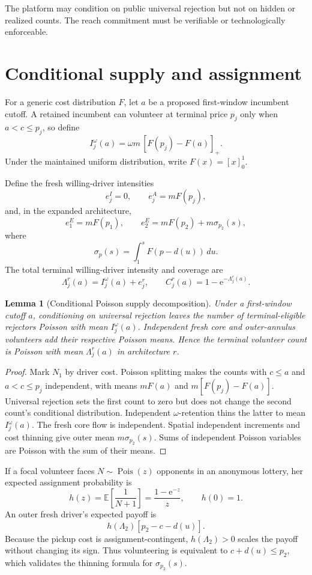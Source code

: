 \documentclass[11pt]{article}
\newtheorem{lemma}[theorem]{Lemma}
\theoremstyle{definition}
\theoremstyle{remark}
\newcommand{\E}{\mathbb E}
\newcommand{\e}{\mathrm e}
\begin{document}
The platform may condition on public universal rejection but not on hidden or
realized counts.  The reach commitment must be verifiable or technologically
enforceable.

\section{Conditional supply and assignment}

For a generic cost distribution $F$, let $a$ be a proposed first-window
incumbent cutoff.  A retained incumbent can volunteer at terminal price $p_j$
only when $a<c\le p_j$, so define
\[
I_j^\omega(a)=\omega m\,[F(p_j)-F(a)]_+.
\]
Under the maintained uniform distribution, write $F(x)=[x]_0^1$.

Define the fresh willing-driver intensities
\[
e_j^I=0,
\qquad
e_j^A=mF(p_j),
\]
and, in the expanded architecture,
\[
e_1^E=mF(p_1),
\qquad
e_2^E=mF(p_2)+m\sigma_{p_2}(s),
\]
where
\[
\sigma_p(s)=\int_1^s F(p-d(u))\,du.
\]
The total terminal willing-driver intensity and coverage are
\[
\Lambda_j^r(a)=I_j^\omega(a)+e_j^r,
\qquad
C_j^r(a)=1-\e^{-\Lambda_j^r(a)}.
\]

\begin{lemma}[Conditional Poisson supply decomposition]
\label{lem:poisson}
Under a first-window cutoff $a$, conditioning on universal rejection leaves
the number of terminal-eligible rejectors Poisson with mean
$I_j^\omega(a)$.  Independent fresh core and outer-annulus volunteers add
their respective Poisson means.  Hence the terminal volunteer count is
Poisson with mean $\Lambda_j^r(a)$ in architecture $r$.
\end{lemma}

\begin{proof}
Mark $N_1$ by driver cost.  Poisson splitting makes the counts with $c\le a$
and $a<c\le p_j$ independent, with means $mF(a)$ and
$m[F(p_j)-F(a)]$.  Universal rejection sets the first count to zero but does
not change the second count's conditional distribution.  Independent
$\omega$-retention thins the latter to mean $I_j^\omega(a)$.  The fresh core
flow is independent.  Spatial independent increments and cost thinning give
outer mean $m\sigma_{p_2}(s)$.  Sums of independent Poisson variables are
Poisson with the sum of their means.
\end{proof}

If a focal volunteer faces $N\sim\operatorname{Pois}(z)$ opponents in an
anonymous lottery, her expected assignment probability is
\[
h(z)=\E\left[\frac1{N+1}\right]
=\frac{1-\e^{-z}}{z},\qquad h(0)=1.
\]
An outer fresh driver's expected payoff is
\[
h(\Lambda_2)[p_2-c-d(u)].
\]
Because the pickup cost is assignment-contingent, $h(\Lambda_2)>0$ scales the
payoff without changing its sign.  Thus volunteering is equivalent to
$c+d(u)\le p_2$, which validates the thinning formula for $\sigma_{p_2}(s)$.
\end{document}
